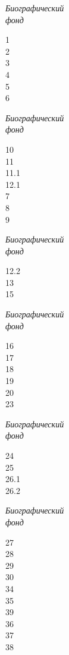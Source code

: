 \documentclass{article}
\begin{document}
\fontsize{60}{72}\selectfont

\newcommand{\romannum}[1]{{\vspace*{\fill}\fontsize{80}{100}\selectfont{#1}}}

\newcommand{\bftitle}[0]{{\fontsize{60}{72}\selectfont \itshape{Биографический \\ фонд}\vspace*{\fill}}}





\bftitle

1\\
2\\
3\\
4\\
5\\
6\\
\romannum{I}

\newpage

\bftitle

10\\
11\\
11.1\\
12.1\\
7\\
8\\
9\\
\romannum{II}

\newpage

\bftitle

12.2\\
13\\
15\\
\romannum{III}

\newpage

\bftitle

16\\
17\\
18\\
19\\
20\\
23\\
\romannum{IV}

\newpage

\bftitle

24\\
25\\
26.1\\
26.2\\
\romannum{V}

\newpage

\bftitle
\begin{multicols}{3}
27\\
28\\
29\\
30\\
34\\
35\\
39\\
36\\
37\\
38\\
\end{multicols}
\romannum{VI}
\end{document}
